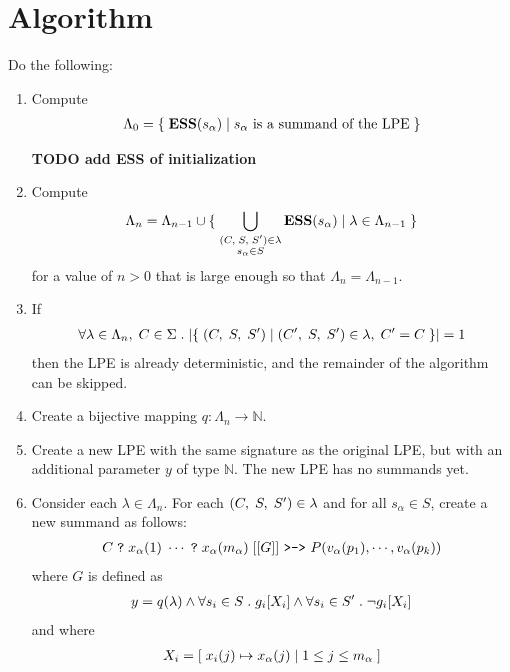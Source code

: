 \chapter{Algorithm}

Do the following:
\begin{enumerate}[1.]
\item Compute
\begin{align*}
\Lambda_0 = \{\;\mathbf{ESS}(s_\alpha)\;|\;\text{$s_\alpha$ is a summand of the LPE}\;\}
\end{align*}

\textbf{TODO add ESS of initialization}

\item Compute
\begin{align*}
\Lambda_n = \Lambda_{n-1} \cup \{\;\bigcup\limits_{\substack{(C,\; S,\; {S}^\prime) \in \lambda\\ s_\alpha \in S}} \mathbf{ESS}(s_\alpha)\;|\;\lambda \in \Lambda_{n-1}\;\}
\end{align*}
for a value of $n > 0$ that is large enough so that $\Lambda_n = \Lambda_{n-1}$.
\item If
\begin{align*}
\forall \lambda \in \Lambda_n,\; C \in \Sigma \; .\; |\{\;(C,\; S,\; {S}^\prime)\;|\;({C}^\prime,\; S,\; {S}^\prime) \in \lambda,\; {C}^\prime = C\;\}| = 1
\end{align*}
then the LPE is already deterministic, and the remainder of the algorithm can be skipped.
\item Create a bijective mapping $q : \Lambda_n \rightarrow \mathbb{N}$.
\item Create a new LPE with the same signature as the original LPE, but with an additional parameter $y$ of type $\mathbb{N}$.
The new LPE has no summands yet.
\item Consider each $\lambda \in \Lambda_n$.
For each $(C,\; S,\; {S}^\prime) \in \lambda$ and for all $s_\alpha \in S$, create a new summand as follows:
\begin{align*}
C \; \texttt{?} \; x_\alpha(1) \; \cdots{} \; \texttt{?} \; x_\alpha(m_\alpha) \; [[G]] \text{ \texttt{>->} } P(v_\alpha(p_1), \cdots{}, v_\alpha(p_k))
\end{align*}
where $G$ is defined as
\begin{align*}
y = q(\lambda) \land \forall s_i \in S \; .\; g_i[X_i] \land \forall s_i \in {S}^\prime \; .\; \neg g_i[X_i]
\end{align*}
and where
\begin{align*}
X_i = [\;x_i(j) \mapsto x_\alpha(j)\;|\;1 \leq j \leq m_\alpha\;]
\end{align*}
\end{enumerate}


